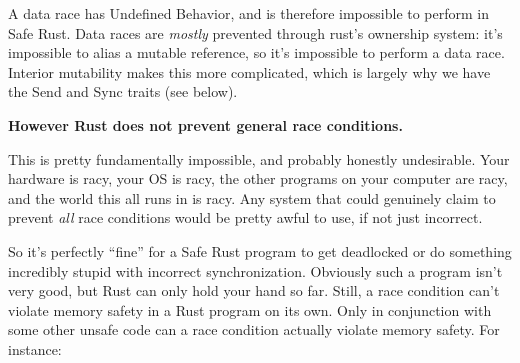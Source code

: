 \documentclass[a4paper,]{book}
\begin{document}
A data race has Undefined Behavior, and is therefore impossible to
perform in Safe Rust. Data races are \emph{mostly} prevented through
rust's ownership system: it's impossible to alias a mutable reference,
so it's impossible to perform a data race. Interior mutability makes
this more complicated, which is largely why we have the Send and Sync
traits (see below).

\textbf{However Rust does not prevent general race conditions.}

This is pretty fundamentally impossible, and probably honestly
undesirable. Your hardware is racy, your OS is racy, the other programs
on your computer are racy, and the world this all runs in is racy. Any
system that could genuinely claim to prevent \emph{all} race conditions
would be pretty awful to use, if not just incorrect.

So it's perfectly ``fine'' for a Safe Rust program to get deadlocked or
do something incredibly stupid with incorrect synchronization. Obviously
such a program isn't very good, but Rust can only hold your hand so far.
Still, a race condition can't violate memory safety in a Rust program on
its own. Only in conjunction with some other unsafe code can a race
condition actually violate memory safety. For instance:
\end{document}
